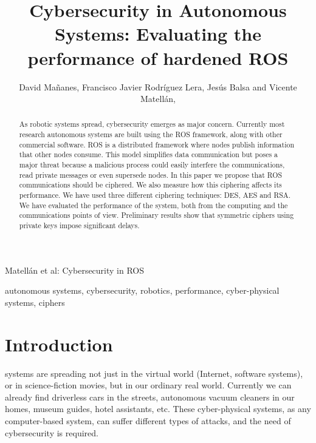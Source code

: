 \documentclass[journal,twoside]{JoPhA}
\begin{document}
\title{Cybersecurity in Autonomous Systems: Evaluating the performance of hardened ROS}

\author{David Ma\~nanes, Francisco Javier Rodr\'iguez Lera, Jes\'us Balsa and Vicente Matell\'an,
}

%
{Matell\'an et al: Cybersecurity in ROS}
\maketitle


\begin{abstract}
As robotic systems spread, cybersecurity emerges as major concern. Currently most research autonomous systems are built using the ROS framework, along with other commercial software. ROS is a distributed framework where nodes publish information that other nodes consume. This model simplifies data communication but poses a major threat because a malicious process could easily interfere the communications, read private messages or even supersede nodes. In this paper we propose that ROS communications should be ciphered. We also measure how this ciphering affects its performance. We have used three different ciphering techniques: DES, AES and RSA. We have evaluated the performance of the system, both from the computing and the communications points of view. Preliminary results show that symmetric ciphers using private keys impose significant delays.

\end{abstract}


\begin{IEEEkeywords}
autonomous systems, cybersecurity, robotics, performance, cyber-physical systems, ciphers
\end{IEEEkeywords}


\section{Introduction}

 systems are spreading not just in the virtual world (Internet, software systems), or in science-fiction movies, but in our ordinary real world. Currently we can already find driverless cars in the streets, autonomous vacuum cleaners in our homes, museum guides, hotel assistants, etc. These cyber-physical systems, as any computer-based system, can suffer different types of attacks, and the need of cybersecurity \cite{Morante2015} is required. 
\end{document}

